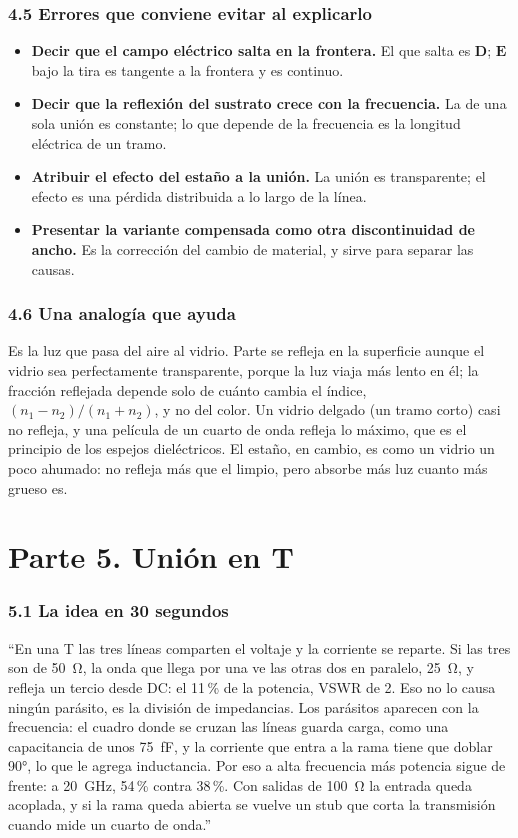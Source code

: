 \documentclass[11pt,letterpaper]{article}
\begin{document}
\section*{4.5 Errores que conviene evitar al explicarlo}
\begin{itemize}
\item \textbf{Decir que el campo eléctrico salta en la frontera.} El que salta es $\mathbf{D}$; $\mathbf{E}$ bajo la tira es tangente a la frontera y es continuo.
\item \textbf{Decir que la reflexión del sustrato crece con la frecuencia.} La de una sola unión es constante; lo que depende de la frecuencia es la longitud eléctrica de un tramo.
\item \textbf{Atribuir el efecto del estaño a la unión.} La unión es transparente; el efecto es una pérdida distribuida a lo largo de la línea.
\item \textbf{Presentar la variante compensada como otra discontinuidad de ancho.} Es la corrección del cambio de material, y sirve para separar las causas.
\end{itemize}

\section*{4.6 Una analogía que ayuda}
Es la luz que pasa del aire al vidrio. Parte se refleja en la superficie aunque el vidrio sea perfectamente transparente, porque la luz viaja más lento en él; la fracción reflejada depende solo de cuánto cambia el índice, $(n_1-n_2)/(n_1+n_2)$, y no del color. Un vidrio delgado (un tramo corto) casi no refleja, y una película de un cuarto de onda refleja lo máximo, que es el principio de los espejos dieléctricos. El estaño, en cambio, es como un vidrio un poco ahumado: no refleja más que el limpio, pero absorbe más luz cuanto más grueso es.

\newpage
\part*{Parte 5. Unión en T}

\section*{5.1 La idea en 30 segundos}
\begin{idea}
``En una T las tres líneas comparten el voltaje y la corriente se reparte. Si las tres son de \SI{50}{\ohm}, la onda que llega por una ve las otras dos en paralelo, \SI{25}{\ohm}, y refleja un tercio desde DC: el 11\,\% de la potencia, VSWR de 2. Eso no lo causa ningún parásito, es la división de impedancias. Los parásitos aparecen con la frecuencia: el cuadro donde se cruzan las líneas guarda carga, como una capacitancia de unos \SI{75}{fF}, y la corriente que entra a la rama tiene que doblar \ang{90}, lo que le agrega inductancia. Por eso a alta frecuencia más potencia sigue de frente: a \SI{20}{GHz}, 54\,\% contra 38\,\%. Con salidas de \SI{100}{\ohm} la entrada queda acoplada, y si la rama queda abierta se vuelve un stub que corta la transmisión cuando mide un cuarto de onda.''
\end{idea}
\end{document}
